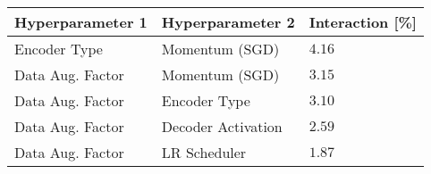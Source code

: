 \begin{tabular}{lll}
\toprule
Hyperparameter 1 & Hyperparameter 2 & Interaction [\%] \\
\midrule
Encoder Type & Momentum (SGD) & $4.16$ \\
Data Aug. Factor & Momentum (SGD) & $3.15$ \\
Data Aug. Factor & Encoder Type & $3.10$ \\
Data Aug. Factor & Decoder Activation & $2.59$ \\
Data Aug. Factor & LR Scheduler & $1.87$ \\
\bottomrule
\end{tabular}
